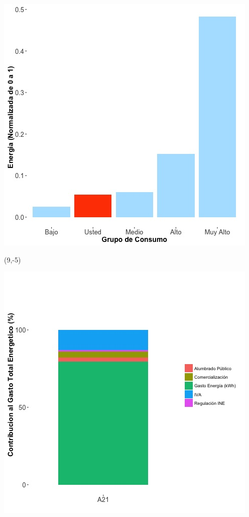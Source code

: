 \documentclass{article}\usepackage[]{graphicx}\usepackage[]{color}
\newenvironment{knitrout}{}{} %
\begin{document}
\begin{knitrout}
\color{fgcolor}
\includegraphics[scale=0.65]{figure/A21_neighbor_plot} 
\end{knitrout}

 \begin{textblock}{1}(9,-5)
\begin{minipage}{20em}
\begingroup

\endgroup
\end{minipage}
\end{textblock}

\begin{knitrout}
\color{fgcolor}
\includegraphics[scale=0.65]{figure/A21_costvars_plot.jpg} 
\end{knitrout}
\end{document}
